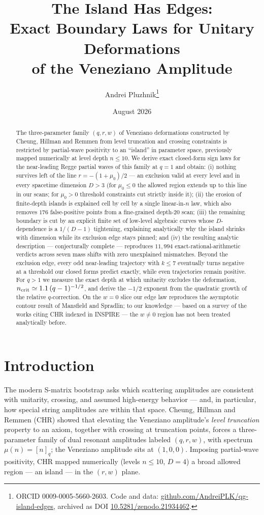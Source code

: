 \documentclass[11pt]{article}
\title{The Island Has Edges:\\ Exact Boundary Laws for Unitary Deformations\\ of the Veneziano Amplitude}
\author{Andrei Pluzhnik\thanks{ORCID 0009-0005-5660-2603. Code and data:
\href{https://github.com/AndreiPLK/qg-island-edges}{github.com/AndreiPLK/qg-island-edges},
archived as DOI \href{https://doi.org/10.5281/zenodo.21934462}{10.5281/zenodo.21934462}.}}
\date{August 2026}
\begin{document}
\maketitle

\begin{abstract}
The three-parameter family $(q,r,w)$ of Veneziano deformations constructed by
Cheung, Hillman and Remmen from level truncation and crossing constraints is
restricted by partial-wave positivity to an ``island'' in parameter space,
previously mapped numerically at level depth $n\le 10$. We derive exact
closed-form sign laws for the near-leading Regge partial waves of this family
at $q=1$ and obtain: (i) nothing survives left of the line
$r=-(1+\mu_0)/2$ --- an exclusion valid at every level and in every spacetime
dimension $D>3$ (for $\mu_0\le 0$ the allowed region extends up to this line
in our scans; for $\mu_0>0$ threshold constraints cut strictly inside it);
(ii) the erosion of finite-depth islands is explained cell by cell by a
single linear-in-$n$ law, which also removes $176$ false-positive points from a
fine-grained depth-$20$ scan; (iii) the remaining boundary is cut by an
explicit finite set of low-level algebraic curves whose $D$-dependence is a
$1/(D-1)$ tightening, explaining analytically why the island shrinks with
dimension while its exclusion edge stays pinned; and (iv) the resulting analytic
description --- conjecturally complete --- reproduces $11{,}994$
exact-rational-arithmetic verdicts across seven mass shifts with zero
unexplained mismatches. Beyond the exclusion edge, every odd near-leading
trajectory with $k\le 7$ eventually turns negative at a threshold our closed
forms predict exactly, while even trajectories remain positive. For $q>1$ we
measure the exact depth at which unitarity excludes the deformation,
$n_{\rm crit}\simeq 1.1\,(q-1)^{-1/2}$, and derive the $-1/2$ exponent from
the quadratic growth of the relative $q$-correction. On the $w=0$ slice our
edge law reproduces the asymptotic contour result of Mansfield and Spradlin;
to our knowledge --- based on a survey of the works citing CHR indexed in
INSPIRE --- the $w\neq 0$ region has not been treated analytically before.
\end{abstract}

\section{Introduction}

The modern S-matrix bootstrap asks which scattering amplitudes are consistent
with unitarity, crossing, and assumed high-energy behavior --- and, in
particular, how special string amplitudes are within that space. Cheung,
Hillman and Remmen (CHR) \cite{CHR2024} showed that elevating the Veneziano
amplitude's \emph{level truncation} property to an axiom, together with
crossing at truncation points, forces a three-parameter family of dual
resonant amplitudes labeled $(q,r,w)$, with spectrum $\mu(n)=[n]_q$; the
Veneziano amplitude sits at $(1,0,0)$. Imposing partial-wave positivity, CHR
mapped numerically (levels $n\le 10$, $D=4$) a broad allowed region --- an
island --- in the $(r,w)$ plane.
\end{document}
